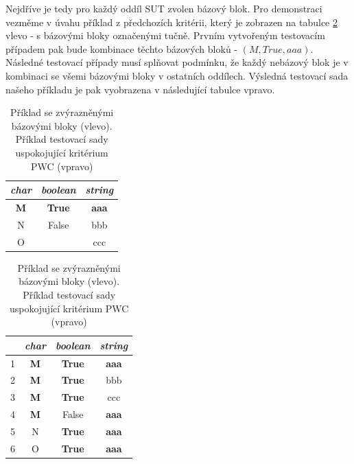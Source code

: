 Nejdříve je tedy pro každý oddíl SUT zvolen bázový blok. Pro demonstraci vezměme v úvahu příklad z předchozích kritérii, který je zobrazen na tabulce \ref{table_bcc} vlevo - s bázovými bloky označenými tučně. Prvním vytvořeným testovacím případem pak bude kombinace těchto bázových bloků - $(M, True, aaa)$. Následné testovací případy musí splňovat podmínku, že každý nebázový blok je v kombinaci se všemi bázovými bloky v ostatních oddílech. Výsledná testovací sada našeho příkladu je pak vyobrazena v následující tabulce vpravo. 




\begin{table}[h!]
\centering
\begin{tabular}{ |c|c|c| } 
 \hline
\textit{char} & \textit{boolean} & \textit{string} \\ 
 \hline
 \textbf{M} & \textbf{True} & \textbf{aaa} \\
 N & False & bbb \\
 O &  & ccc \\ 
 \hline
\end{tabular}
\quad
\begin{tabular}{ |c|ccc| } 
 \hline
& \textit{char} & \textit{boolean} & \textit{string} \\ 
\hline
1 & \textbf{M} & \textbf{True} & \textbf{aaa} \\
2 &  \textbf{M} & \textbf{True} & bbb \\
3 &  \textbf{M} & \textbf{True} & ccc \\
4 &  \textbf{M} & False & \textbf{aaa} \\
5 &  N & \textbf{True} & \textbf{aaa} \\
6 &  O & \textbf{True} & \textbf{aaa} \\
 \hline
\end{tabular}
\caption{Příklad se zvýrazněnými bázovými bloky (vlevo). Příklad testovací sady uspokojující kritérium PWC (vpravo)}
\label{table_bcc}
\end{table}


